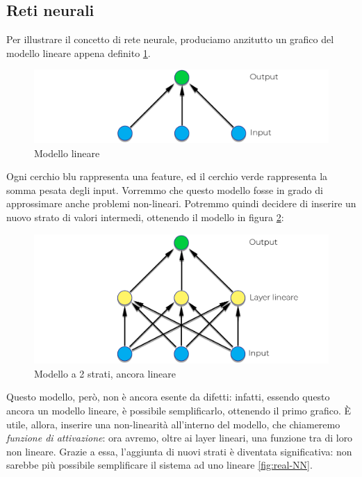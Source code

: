 \subsection{Reti neurali}
Per illustrare il concetto di rete neurale, produciamo anzitutto un grafico del modello lineare appena definito \ref{fig:linear-NN}.
\begin{figure}[H]
    \begin{center}
        \includegraphics[width=0.8\columnwidth]{images/stateofart/linear-NN.png}
    \end{center}
    \caption{Modello lineare}
    \label{fig:linear-NN}
\end{figure}
Ogni cerchio blu rappresenta una feature, ed il cerchio verde rappresenta la somma pesata degli input. Vorremmo che questo modello fosse in grado di approssimare anche problemi non-lineari. Potremmo quindi decidere di inserire un nuovo strato di valori intermedi, ottenendo il modello in figura \ref{fig:double-linear-NN}:
\begin{figure}[H]
    \begin{center}
        \includegraphics[width=0.8\columnwidth]{images/stateofart/double-linear-NN.png}
    \end{center}
    \caption{Modello a 2 strati, ancora lineare}
    \label{fig:double-linear-NN}
\end{figure}
Questo modello, però, non è ancora esente da difetti: infatti, essendo questo ancora un modello lineare, è possibile semplificarlo, ottenendo il primo grafico. È utile, allora, inserire una non-linearità all'interno del modello, che chiameremo \textit{funzione di attivazione}: ora avremo, oltre ai layer lineari, una funzione tra di loro non lineare. Grazie a essa, l'aggiunta di nuovi strati è diventata significativa: non sarebbe più possibile semplificare il sistema ad uno lineare \ref{fig:real-NN}.

